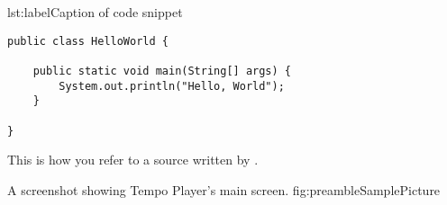 


\begin{code}{lst:label}{Caption of code snippet}
\begin{lstlisting}
public class HelloWorld {

    public static void main(String[] args) {
        System.out.println("Hello, World");
    }

}
\end{lstlisting}
\end{code}

This is how you refer to a source written by \citet{preambleExample}.

{A screenshot showing Tempo Player's main screen.} %
{fig:preambleSamplePicture} %